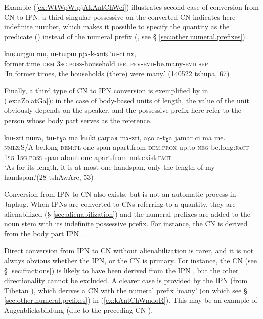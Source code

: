 Example (\ref{ex:WtWpW.pjAkAntChWci}) illustrates second case of conversion from CN to IPN: a third singular possessive on the converted CN indicates here indefinite number, which makes it possible to specify the quantity as the predicate () instead of the numeral prefix (, see § \ref{sec:other.numeral.prefixes}).

\begin{exe}
\ex \label{ex:WtWpW.pjAkAntChWci}
 \gll kɯɕɯŋgɯ nɯ, ɯ-tɯpɯ pjɤ-k-ɤntɕʰɯ-ci nɤ, \\
 former.time \textsc{dem} \textsc{3sg}.\textsc{poss}-household \textsc{ifr}.\textsc{ipfv}-\textsc{evd}-be.many-\textsc{evd} \textsc{sfp} \\
\glt `In former times, the households (there) were many.' (140522 tshupa, 67)
\end{exe}

Finally, a third type of CN to IPN conversion is exemplified by  in (\ref{ex:aZo.atGa}): in the case of body-based units of length, the value of the unit obviously depends on the speaker, and the possessive prefix here refer to the person whose body part serves as the reference.

\begin{exe}
\ex \label{ex:aZo.atGa}
 \gll kɯ-zri nɯra, tɯ-tɣa ma kɯki ɕaŋtaʁ mɤ-zri, aʑo a-tɣa jamar ci ma me. \\
 \textsc{nmlz}:S/A-be.long \textsc{dem}:\textsc{pl} one-span apart.from \textsc{dem}.\textsc{prox} up.to \textsc{neg}-be.long:\textsc{fact} \textsc{1sg} \textsc{1sg}.\textsc{poss}-span about one apart.from not.exist:\textsc{fact} \\
 \glt `As for its length, it is at most one handspan, only the length of my handspan.'(28-tshAwAre, 53)
\end{exe}
Conversion from IPN to CN also exists, but is not an automatic process in Japhug. When IPNs are converted to CNs referring to a quantity, they are alienabilized (§ \ref{sec:alienabilization}) and the numeral prefixes are added to the noun stem with its indefinite possessive prefix. For instance, the CN  is derived from the body part IPN . 

Direct conversion from IPN to CN without alienabilization is rarer, and it is not always obvious whether the IPN, or the CN is primary. For instance, the CN  (see § \ref{sec:fractions}) is likely to have been derived from the IPN , but the other directionality cannot be excluded. A clearer case is provided by the IPN   (from Tibetan ), which derives a CN with the numeral prefix  `many' (on which see § \ref{sec:other.numeral.prefixes}) in (\ref{ex:kAntChWmdoR}). This may be an example of Augenblicksbildung (due to the preceding CN ).

